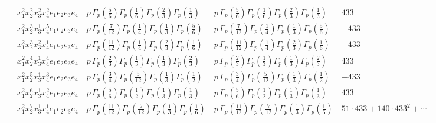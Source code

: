 \documentclass[11pt]{article}
\begin{document}
\begin{table}[ht]
{\begin{tabular}{@{}lllll@{}}
 & $x_{1}^{2} x_{2}^{2} x_{3}^{2} x_{4}^{2}  e_{1} e_{2} e_{3} e_{4}$ & $p \, \Gamma_p \left( \frac{5}{6} \right) \Gamma_p \left( \frac{1}{6} \right) \Gamma_p \left( \frac{2}{3} \right) \Gamma_p \left( \frac{1}{3} \right)$ & $p \, \Gamma_p \left( \frac{5}{6} \right) \Gamma_p \left( \frac{1}{6} \right) \Gamma_p \left( \frac{2}{3} \right) \Gamma_p \left( \frac{1}{3} \right)$ & $433$ \\
 & $x_{1}^{2} x_{2}^{3} x_{3}^{1} x_{4}^{5}  e_{1} e_{2} e_{3} e_{4}$ & $p \, \Gamma_p \left( \frac{7}{12} \right) \Gamma_p \left( \frac{1}{4} \right) \Gamma_p \left( \frac{1}{3} \right) \Gamma_p \left( \frac{5}{6} \right)$ & $p \, \Gamma_p \left( \frac{7}{12} \right) \Gamma_p \left( \frac{1}{4} \right) \Gamma_p \left( \frac{1}{3} \right) \Gamma_p \left( \frac{5}{6} \right)$ & $-433$ \\
 & $x_{1}^{2} x_{2}^{3} x_{3}^{2} x_{4}^{1}  e_{1} e_{2} e_{3} e_{4}$ & $p \, \Gamma_p \left( \frac{11}{12} \right) \Gamma_p \left( \frac{1}{4} \right) \Gamma_p \left( \frac{2}{3} \right) \Gamma_p \left( \frac{1}{6} \right)$ & $p \, \Gamma_p \left( \frac{11}{12} \right) \Gamma_p \left( \frac{1}{4} \right) \Gamma_p \left( \frac{2}{3} \right) \Gamma_p \left( \frac{1}{6} \right)$ & $-433$ \\
 & $x_{1}^{2} x_{2}^{4} x_{3}^{1} x_{4}^{4}  e_{1} e_{2} e_{3} e_{4}$ & $p \, \Gamma_p \left( \frac{2}{3} \right) \Gamma_p \left( \frac{1}{3} \right) \Gamma_p \left( \frac{1}{3} \right) \Gamma_p \left( \frac{2}{3} \right)$ & $p \, \Gamma_p \left( \frac{2}{3} \right) \Gamma_p \left( \frac{1}{3} \right) \Gamma_p \left( \frac{1}{3} \right) \Gamma_p \left( \frac{2}{3} \right)$ & $433$ \\
 & $x_{1}^{2} x_{2}^{5} x_{3}^{1} x_{4}^{3}  e_{1} e_{2} e_{3} e_{4}$ & $p \, \Gamma_p \left( \frac{3}{4} \right) \Gamma_p \left( \frac{5}{12} \right) \Gamma_p \left( \frac{1}{3} \right) \Gamma_p \left( \frac{1}{2} \right)$ & $p \, \Gamma_p \left( \frac{3}{4} \right) \Gamma_p \left( \frac{5}{12} \right) \Gamma_p \left( \frac{1}{3} \right) \Gamma_p \left( \frac{1}{2} \right)$ & $-433$ \\
 & $x_{1}^{2} x_{2}^{6} x_{3}^{1} x_{4}^{2}  e_{1} e_{2} e_{3} e_{4}$ & $p \, \Gamma_p \left( \frac{5}{6} \right) \Gamma_p \left( \frac{1}{2} \right) \Gamma_p \left( \frac{1}{3} \right) \Gamma_p \left( \frac{1}{3} \right)$ & $p \, \Gamma_p \left( \frac{5}{6} \right) \Gamma_p \left( \frac{1}{2} \right) \Gamma_p \left( \frac{1}{3} \right) \Gamma_p \left( \frac{1}{3} \right)$ & $433$ \\
 & $x_{1}^{2} x_{2}^{7} x_{3}^{1} x_{4}^{1}  e_{1} e_{2} e_{3} e_{4}$ & $p \, \Gamma_p \left( \frac{11}{12} \right) \Gamma_p \left( \frac{7}{12} \right) \Gamma_p \left( \frac{1}{3} \right) \Gamma_p \left( \frac{1}{6} \right)$ & $p \, \Gamma_p \left( \frac{11}{12} \right) \Gamma_p \left( \frac{7}{12} \right) \Gamma_p \left( \frac{1}{3} \right) \Gamma_p \left( \frac{1}{6} \right)$ & $51{\cdot}433{+}140{\cdot}433^{2}{+}\cdots$ \\

\end{tabular}}
\end{table}
\end{document}
